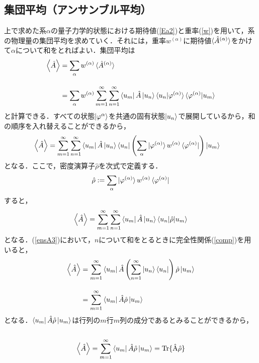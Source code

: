 \documentclass[12pt]{jsarticle}\usepackage{ifthen}\newboolean{enlarge}\setboolean{enlarge}{false}
\begin{document}
%
\subsection{集団平均（アンサンブル平均）}
上で求めた系$\alpha$の量子力学的状態における期待値(\ref{Ea2})と重率(\ref{w})を用いて，系の物理量の集団平均を求めていく．それには，重率$w^{(\alpha)}$に期待値$\braket{\hat{A}^{(\alpha)}}$をかけて$\alpha$について和をとればよい．集団平均は
　\begin{align}
\label{ensA1}
\Braket{\hat{A}}&=\displaystyle\sum_{\alpha}w^{(\alpha)}\braket{\hat{A}^{(\alpha)}}\notag\\[10pt]
%
&=
\displaystyle\sum_{\alpha}w^{(\alpha)}\displaystyle\sum_{m=1}^\infty\displaystyle\sum_{n=1}^\infty
\bra{u_m}
\hat{A}
\ket{u_n}\braket{u_n|\varphi^{(\alpha)}}\braket{\varphi^{(\alpha)}|u_m}
\end{align}
と計算できる．すべての状態$\ket{\varphi^{\alpha}}$を共通の固有状態$\ket{u_n}$で展開しているから，和の順序を入れ替えることができるから，
　\begin{align}
\label{ensA2}
\Braket{\hat{A}}
&=
\displaystyle\sum_{m=1}^\infty\displaystyle\sum_{n=1}^\infty
\bra{u_m}
\hat{A}
\ket{u_n}\bra{u_n}
\left(
\displaystyle\sum_{\alpha}
\ket{\varphi^{(\alpha)}}w^{(\alpha)}\bra{\varphi^{(\alpha)}}
\right)
\ket{u_m}
\end{align}
となる．ここで，密度演算子$\hat{\rho}$を次式で定義する．
　\begin{align}
\label{dope}
\hat{\rho}:=\displaystyle\sum_{\alpha}
\ket{\varphi^{(\alpha)}}w^{(\alpha)}\bra{\varphi^{(\alpha)}}
\end{align}
すると，
　\begin{align}
\label{ensA3}
\Braket{\hat{A}}
=
\displaystyle\sum_{m=1}^\infty\displaystyle\sum_{n=1}^\infty
\bra{u_m}
\hat{A}
\ket{u_n}\braket{u_n|\hat{\rho}|u_m}
\end{align}
となる．(\ref{ensA3})において，$n$について和をとるときに完全性関係(\ref{comp})を用いると，
　\begin{align}
\label{ensA4}
\Braket{\hat{A}}
&=
\displaystyle\sum_{m=1}^\infty
\bra{u_m}\hat{A}
\left(
\displaystyle\sum_{n=1}^\infty
\ket{u_n}
\bra{u_n}
\right)
\hat{\rho}
\ket{u_m}\notag\\[10pt]
%
&=
\displaystyle\sum_{m=1}^\infty
\bra{u_m}\hat{A}
\hat{\rho}
\ket{u_m}
\end{align}
となる．$\bra{u_m}\hat{A}\hat{\rho}\ket{u_m}$は行列の$m$行$m$列の成分であるとみることができるから，
　\begin{align}
\label{ensA}
\Braket{\hat{A}}=
\displaystyle\sum_{m=1}^\infty
\bra{u_m}\hat{A}
\hat{\rho}
\ket{u_m}
%
=
\rm{Tr}
\{
\hat{A}
\hat{\rho}
\}
\end{align}
\end{document}
